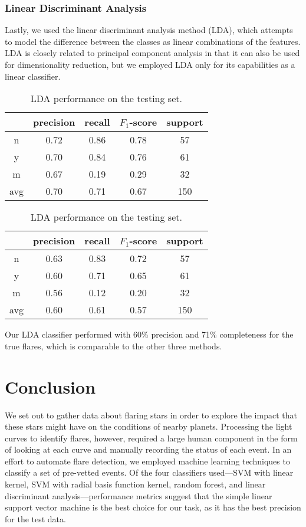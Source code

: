 \documentclass[11pt]{article}
\begin{document}
\subsubsection{Linear Discriminant Analysis}
\label{sec:lda}
Lastly, we used the linear discriminant analysis method (LDA), which
attempts to model the difference between the classes as linear
combinations of the features.  LDA is closely related to principal
component analysis in that it can also be used for dimensionality
reduction, but we employed LDA only for its capabilities as a linear
classifier.
\begin{table}
  \centering
  \begin{tabular}[!htbp]{c|c c c c}
       & precision &recall &$F_1$-score &support \\ \hline
    n  & 0.72      &0.86   &0.78     &57      \\
    y  & 0.70      &0.84   &0.76     &61      \\
    m  & 0.67      &0.19   &0.29     &32      \\ \hline
    avg& 0.70      &0.71   &0.67     &150     \\
  \end{tabular}
  \caption{Reconstructing the training set with LDA.}

  \begin{tabular}[!htbp]{c|c c c c}
        & precision &recall &$F_1$-score &support \\ \hline
    n   & 0.63      &0.83   &0.72     &57      \\
    y   & 0.60      &0.71   &0.65     &61      \\
    m   & 0.56      &0.12   &0.20     &32      \\ \hline
    avg & 0.60      &0.61   &0.57     &150     \\
  \end{tabular}
  \caption{LDA performance on the testing set.}
\end{table}
Our LDA classifier performed with 60\% precision and 71\% completeness
for the true flares, which is comparable to the other three methods.

\section{Conclusion}
\label{sec:conc}
We set out to gather data about flaring stars in order to explore the
impact that these stars might have on the conditions of nearby
planets.  Processing the light curves to identify flares, however,
required a large human component in the form of looking at each curve
and manually recording the status of each event.  In an effort to
automate flare detection, we employed machine learning techniques to
classify a set of pre-vetted events.  Of the four classifiers
used---SVM with linear kernel, SVM with radial basis function kernel,
random forest, and linear discriminant analysis---performance metrics
suggest that the simple linear support vector machine is the best
choice for our task, as it has the best precision for the test data.
\end{document}
